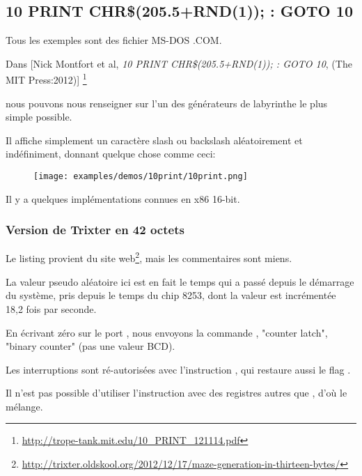\subsection{10 PRINT CHR\$(205.5+RND(1)); : GOTO 10}

Tous les exemples sont des fichier MS-DOS .COM.

Dans [Nick Montfort et al, \emph{10 PRINT CHR\$(205.5+RND(1)); : GOTO 10}, (The MIT Press:2012)]
\footnote{\AlsoAvailableAs \url{http://trope-tank.mit.edu/10_PRINT_121114.pdf}}

nous pouvons nous renseigner sur l'un des générateurs de labyrinthe le plus simple
possible.

Il affiche simplement un caractère slash ou backslash aléatoirement et indéfiniment,
donnant quelque chose comme ceci:

\begin{figure}[H]
\centering
\texttt{[image: examples/demos/10print/10print.png]}
\end{figure}

Il y a quelques implémentations connues en x86 16-bit.

\subsubsection{Version de Trixter en 42 octets}

\newcommand{\FNURLTRIXTER}{\footnote{\url{http://trixter.oldskool.org/2012/12/17/maze-generation-in-thirteen-bytes/}}}

Le listing provient du site web\FNURLTRIXTER, mais les commentaires sont miens.



La valeur pseudo aléatoire ici est en fait le temps qui a passé depuis le démarrage
du système, pris depuis le temps du chip 8253, dont la valeur est incrémentée 18,2
fois par seconde.

En écrivant zéro sur le port ,
nous envoyons la commande ,
"counter latch", 
"binary counter" (pas une valeur \ac{BCD}).

Les interruptions sont ré-autorisées avec l'instruction , qui restaure aussi
le flag .

Il n'est pas possible d'utiliser l'instruction  avec des registres autres
que , d'où le mélange.

